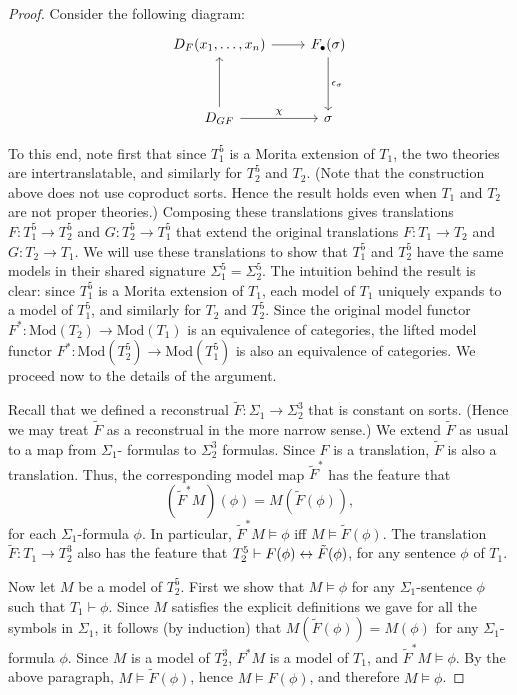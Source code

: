 \begin{proof}
Consider the following diagram:
\[ \begin{tikzcd}
    D_F(x_1,\dots ,x_n) \arrow{r} &
    F_\bullet (\sigma ) \arrow{dd}{\ve _\sigma} \\
\\
    D_{GF}  \arrow{uu} \arrow{r}{\chi} & \sigma \end{tikzcd} \]




To this end, note first that since $T_1^5$ is a Morita
extension of $T_1$, the two theories are intertranslatable, and
similarly for $T_2^5$ and $T_2$.  (Note that the construction above
does not use coproduct sorts.  Hence the result holds even when $T_1$
and $T_2$ are not proper theories.)  Composing these translations
gives translations $F:T_1^5\to T_2^5$ and $G:T_2^5\to T_1^5$ that
extend the original translations $F:T_1\to T_2$ and $G:T_2\to T_1$. We
will use these translations to show that $T_1^5$ and $T_2^5$ have the
same models in their shared signature $\Sigma _1^5=\Sigma _2^5$.  The
intuition behind the result is clear: since $T_1^5$ is a Morita
extension of $T_1$, each model of $T_1$ uniquely expands to a model of
$T_1^5$, and similarly for $T_2$ and $T_2^5$.  Since the original
model functor $F^*:\mathrm{Mod}(T_2)\to \mathrm{Mod}(T_1)$ is an
equivalence of categories, the lifted model functor
$F^*:\mathrm{Mod}(T_2^5)\to \mathrm{Mod}(T_1^5)$ is also an
equivalence of categories.  We proceed now to the details of the
argument.

  Recall that we defined a reconstrual
  $\tilde{F}:\Sigma _1\to \Sigma _2^3$ that is constant on sorts.
  (Hence we may treat $\tilde{F}$ as a reconstrual in the more narrow
  sense.)  We extend $\tilde{F}$ as usual to a map from $\Sigma _1$-
  formulas to $\Sigma _2^3$ formulas.  Since $F$ is a translation,
  $\tilde{F}$ is also a translation.  Thus, the corresponding model
  map $\tilde{F}^*$ has the feature that
  \[ (\tilde{F}^*M)(\phi ) = M(\tilde{F}(\phi )) ,\] for each
  $\Sigma _1$-formula $\phi$.  In particular, $\tilde{F}^*M\vDash\phi$
  iff $M\vDash \tilde{F}(\phi )$.  The translation
  $\tilde{F}:T_1\to T_2^3$ also has the feature that
  $T_2^5\vdash F(\phi )\leftrightarrow \tilde{F}(\phi )$, for any sentence $\phi$
  of $T_1$.

  Now let $M$ be a model of $T_2^5$.  First we show that
  $M\vDash \phi$ for any $\Sigma _1$-sentence $\phi$ such that
  $T_1\vdash\phi$.  Since $M$ satisfies the explicit definitions we
  gave for all the symbols in $\Sigma _1$, it follows (by induction)
  that $M(\tilde{F}(\phi ))=M(\phi )$ for any $\Sigma _1$-formula
  $\phi$.  Since $M$ is a model of $T_2^3$, $F^*M$ is a model of
  $T_1$, and $\tilde{F}^*M\vDash\phi$.  By the above paragraph,
  $M\vDash \tilde{F}(\phi )$, hence $M\vDash F(\phi )$, and therefore
  $M\vDash\phi$.


\end{proof}
